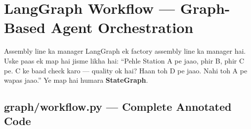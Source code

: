 \documentclass[11pt,a4paper,twoside]{report}
\begin{document}

\chapter{LangGraph Workflow --- Graph-Based Agent Orchestration}

\begin{storybox}{Assembly line ka manager}
LangGraph ek factory assembly line ka manager hai. Uske paas ek map hai jisme likha hai: ``Pehle Station A pe jaao, phir B, phir C pe. C ke baad check karo --- quality ok hai? Haan toh D pe jaao. Nahi toh A pe wapas jaao.'' Ye map hai humara \textbf{StateGraph}.
\end{storybox}

\section{graph/workflow.py --- Complete Annotated Code}
\end{document}
